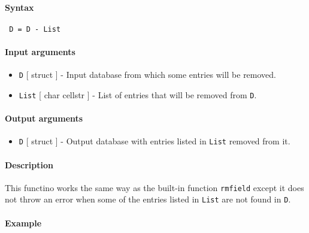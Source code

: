 


	\paragraph{Syntax}
 
 \begin{verbatim}
 D = D - List
 \end{verbatim}
 
 \paragraph{Input arguments}
 
 \begin{itemize}
 \item
   \texttt{D} {[} struct {]} - Input database from which some entries
   will be removed.
 \item
   \texttt{List} {[} char \textbar{} cellstr {]} - List of entries that
   will be removed from \texttt{D}.
 \end{itemize}
 
 \paragraph{Output arguments}
 
 \begin{itemize}
 \item
   \texttt{D} {[} struct {]} - Output database with entries listed in
   \texttt{List} removed from it.
 \end{itemize}
 
 \paragraph{Description}
 
 This functino works the same way as the built-in function
 \texttt{rmfield} except it does not throw an error when some of the
 entries listed in \texttt{List} are not found in \texttt{D}.
 
 \paragraph{Example}


